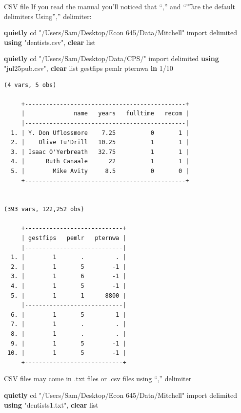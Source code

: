 \documentclass[
]{book}
\newenvironment{Shaded}{\begin{snugshade}}{\end{snugshade}}
\newcommand{\KeywordTok}[1]{\textcolor[rgb]{0.13,0.29,0.53}{\textbf{#1}}}
\newcommand{\NormalTok}[1]{#1}
\newcommand{\OtherTok}[1]{\textcolor[rgb]{0.56,0.35,0.01}{#1}}
\newcommand{\StringTok}[1]{\textcolor[rgb]{0.31,0.60,0.02}{#1}}
\begin{document}
CSV file
If you read the manual you'll noticed that ``,'' and ``\t" are the default delimiters
Using'','' delimiter:

\begin{Shaded}
\begin{Highlighting}[]
\KeywordTok{quietly}\NormalTok{ cd }\StringTok{"/Users/Sam/Desktop/Econ 645/Data/Mitchell"}
\NormalTok{import delimited }\KeywordTok{using} \StringTok{"dentists.csv"}\NormalTok{, }\KeywordTok{clear}
\OtherTok{list}

\KeywordTok{quietly}\NormalTok{ cd }\StringTok{"/Users/Sam/Desktop/Data/CPS/"}
\NormalTok{import delimited }\KeywordTok{using} \StringTok{"jul25pub.csv"}\NormalTok{, }\KeywordTok{clear}
\OtherTok{list}\NormalTok{ gestfips pemlr pternwa }\KeywordTok{in}\NormalTok{ 1/10}
\end{Highlighting}
\end{Shaded}

\begin{verbatim}
(4 vars, 5 obs)

     +----------------------------------------------+
     |              name   years   fulltime   recom |
     |----------------------------------------------|
  1. | Y. Don Uflossmore    7.25          0       1 |
  2. |    Olive Tu'Drill   10.25          1       1 |
  3. | Isaac O'Yerbreath   32.75          1       1 |
  4. |      Ruth Canaale      22          1       1 |
  5. |        Mike Avity     8.5          0       0 |
     +----------------------------------------------+


(393 vars, 122,252 obs)

     +----------------------------+
     | gestfips   pemlr   pternwa |
     |----------------------------|
  1. |        1       .         . |
  2. |        1       5        -1 |
  3. |        1       6        -1 |
  4. |        1       5        -1 |
  5. |        1       1      8800 |
     |----------------------------|
  6. |        1       5        -1 |
  7. |        1       .         . |
  8. |        1       .         . |
  9. |        1       5        -1 |
 10. |        1       5        -1 |
     +----------------------------+
\end{verbatim}

CSV files may come in .txt files or .csv files using ``,'' delimiter

\begin{Shaded}
\begin{Highlighting}[]
\KeywordTok{quietly}\NormalTok{ cd }\StringTok{"/Users/Sam/Desktop/Econ 645/Data/Mitchell"}
\NormalTok{import delimited }\KeywordTok{using} \StringTok{"dentists1.txt"}\NormalTok{, }\KeywordTok{clear}
\OtherTok{list}
\end{Highlighting}
\end{Shaded}
\end{document}
